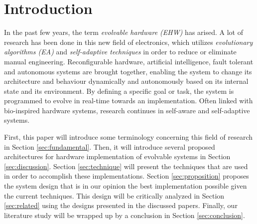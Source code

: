 \section{Introduction}
%
In the past few years, the term \emph{evolvable hardware (EHW)} has arised. A lot of research has been done in this new field of electronics, which utilizes \emph{evolutionary algorithms (EA)} and \emph{self-adaptive techniques}  in order to reduce or eliminate manual engineering. Reconfigurable hardware, artificial intelligence, fault tolerant and autonomous systems are brought together, enabling the system to change its architecture and behaviour dynamically and autonomously based on its internal state and its environment. By defining a specific goal or task, the system is programmed to evolve in real-time towards an implementation. Often linked with bio-inspired hardware systems, research continues in self-aware and self-adaptive systems. 

First, this paper will introduce some terminology concerning this field of research in Section \ref{sec:fundamental}. Then, it will introduce several proposed architectures for hardware implementation of evolvable systems in Section \ref{sec:discussion}. Section \ref{sec:technique} will present the techniques that are used in order to accomplish these implementations. Section \ref{sec:proposition} proposes the system design that is in our opinion the best implementation possible given the current techniques. This design will be critically analyzed in Section \ref{sec:related} using the designs presented in the discussed papers. Finally, our literature study will be wrapped up by a conclusion in Section \ref{sec:conclusion}.